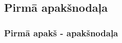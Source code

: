 \lipsum[2-4]
\subsection{Pirmā apakšnodaļa}
\lipsum[5-5]
\subsubsection{Pirmā apakš - apakšnodaļa}
\lipsum[6-6]